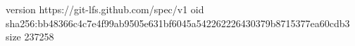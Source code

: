 version https://git-lfs.github.com/spec/v1
oid sha256:bb48366c4c7e4f99ab9505e631bf6045a542262226430379b8715377ea60cdb3
size 237258
